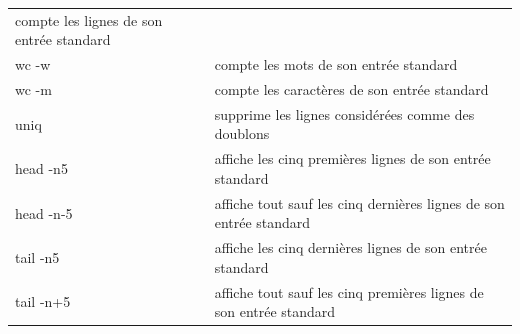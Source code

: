 \documentclass[
  11pt,
]{article}
\begin{document}
\begin{longtable}[]{@{}ll@{}}
\begin{minipage}[t]{0.81\columnwidth}
compte les lignes de son entrée standard\strut
\end{minipage}\tabularnewline
\begin{minipage}[t]{0.13\columnwidth}\raggedright
wc -w\strut
\end{minipage} & \begin{minipage}[t]{0.81\columnwidth}\raggedright
compte les mots de son entrée standard\strut
\end{minipage}\tabularnewline
\begin{minipage}[t]{0.13\columnwidth}\raggedright
wc -m\strut
\end{minipage} & \begin{minipage}[t]{0.81\columnwidth}\raggedright
compte les caractères de son entrée standard\strut
\end{minipage}\tabularnewline
\begin{minipage}[t]{0.13\columnwidth}\raggedright
uniq\strut
\end{minipage} & \begin{minipage}[t]{0.81\columnwidth}\raggedright
supprime les lignes considérées comme des doublons\strut
\end{minipage}\tabularnewline
\begin{minipage}[t]{0.13\columnwidth}\raggedright
head -n5\strut
\end{minipage} & \begin{minipage}[t]{0.81\columnwidth}\raggedright
affiche les cinq premières lignes de son entrée standard\strut
\end{minipage}\tabularnewline
\begin{minipage}[t]{0.13\columnwidth}\raggedright
head -n-5\strut
\end{minipage} & \begin{minipage}[t]{0.81\columnwidth}\raggedright
affiche tout sauf les cinq dernières lignes de son entrée standard\strut
\end{minipage}\tabularnewline
\begin{minipage}[t]{0.13\columnwidth}\raggedright
tail -n5\strut
\end{minipage} & \begin{minipage}[t]{0.81\columnwidth}\raggedright
affiche les cinq dernières lignes de son entrée standard\strut
\end{minipage}\tabularnewline
\begin{minipage}[t]{0.13\columnwidth}\raggedright
tail -n+5\strut
\end{minipage} & \begin{minipage}[t]{0.81\columnwidth}\raggedright
affiche tout sauf les cinq premières lignes de son entrée standard\strut
\end{minipage}\tabularnewline
\bottomrule
\end{longtable}
\end{document}
